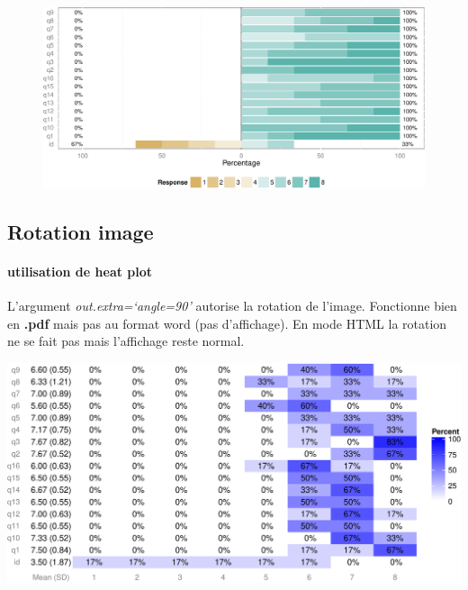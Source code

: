 \documentclass[]{article}
\begin{document}
\begin{figure}[htbp]
\centering
\includegraphics{./questionaire_distance_files/figure-latex/test-4.pdf}
\end{figure}

\subsection{Rotation image}\label{rotation-image}

\paragraph{utilisation de heat plot}\label{utilisation-de-heat-plot}

L'argument \emph{out.extra=`angle=90'} autorise la rotation de l'image.
Fonctionne bien en \textbf{.pdf} mais pas au format word (pas
d'affichage). En mode HTML la rotation ne se fait pas mais l'affichage
reste normal.

\includegraphics[angle=90]{./questionaire_distance_files/figure-latex/rot-1}
\end{document}
